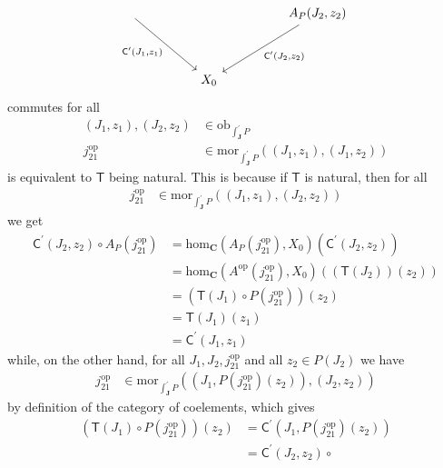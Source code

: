 \begin{prf}
\begin{enumerate}
\[\begin{tikzcd}[sep=huge]
  \arrow[swap]{dr}{\mathsf{C}^{\prime}(J_{1},z_{1})}
  &
  &
  A_{P}(J_{2},z_{2})
  \arrow{dl}{\mathsf{C}^{\prime}(J_{2},z_{2})}
  \\
  &
  X_{0}
  &
\end{tikzcd}
\]
commutes for all
\begin{align*}
  (J_{1},z_{1}),
  (J_{2},z_{2})
  &\in
  \mathrm{ob}_{\int_{\mathbf{J}}^{\prime}P}
  \\
  j_{21}^{\textrm{op}}
  &\in
  \mathrm{mor}_{\int_{\mathbf{J}}^{\prime}P}
  \left(
    (J_{1},z_{1}),
    (J_{1},z_{2})
  \right)
\end{align*}
is equivalent to $\mathsf{T}$ being natural.
This is because if $\mathsf{T}$ is natural, then for all
\begin{align*}
  j_{21}^{\textrm{op}}
  &\in
  \mathrm{mor}_{\int_{\mathbf{J}}^{\prime}P}
  \left(
    (J_{1},z_{1}),
    (J_{2},z_{2})
  \right)
\end{align*}
we get
\begin{align*}
  \mathsf{C}^{\prime}(J_{2},z_{2})
  \circ
  A_{P}(j_{21}^{\textrm{op}})
  &=
  \mathrm{hom}_{\mathbf{C}}
  \left(
    A_{P}(j_{21}^{\textrm{op}}),
    X_{0}
  \right)
  \left(
    \mathsf{C}^{\prime}(J_{2},z_{2})
  \right)
  \\
  &=
  \mathrm{hom}_{\mathbf{C}}
  \left(
    A^{\textrm{op}}(j_{21}^{\textrm{op}}),
    X_{0}
  \right)
  \left(
    (\mathsf{T}(J_{2}))(z_{2})
  \right)
  \\
  &=
  \left(
    \mathsf{T}(J_{1})
    \circ
    P(j_{21}^{\textrm{op}})
  \right)
  (z_{2})
  \tag{NT}
  \\
  &=
  \mathsf{T}(J_{1})(z_{1})
  \\
  &=
  \mathsf{C}^{\prime}(J_{1},z_{1})
\end{align*}
while, on the other hand, for all $J_{1},J_{2},j_{21}^{\textrm{op}}$ and all $z_{2} \in P(J_{2})$ we have
\begin{align*}
  j_{21}^{\textrm{op}}
  &\in
  \mathrm{mor}_{\int_{\mathbf{J}}^{\prime}P}
  \left(
    (J_{1},P(j_{21}^{\textrm{op}})(z_{2})),
    (J_{2},z_{2})
  \right)
\end{align*}
by definition of the category of coelements, which gives
\begin{align*}
  \left(
    \mathsf{T}(J_{1})
    \circ
    P(j_{21}^{\textrm{op}})
  \right)
  (z_{2})
  &=
  \mathsf{C}^{\prime}
  \left(
    J_{1},
    P(j_{21}^{\textrm{op}})(z_{2})
  \right)
  \\
  &=
  \mathsf{C}^{\prime}
  \left(
    J_{2},
    z_{2}
  \right)
  \circ

\end{align*}
\end{enumerate}
\end{prf}
